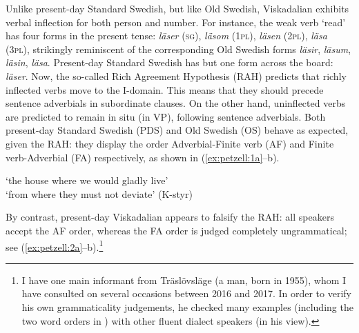 \documentclass[output=paper,colorlinks,citecolor=brown,draft,draftmode]{langscibook}
\begin{document}
Unlike present-day Standard Swedish, but like Old Swedish, Viskadalian exhibits verbal inflection for both person and number. For instance, the weak verb ‘read’ has four forms in the present tense: \textit{läser} (\textsc{sg}), \textit{läsom} (1\textsc{pl}), \textit{läsen} (2\textsc{pl}), \textit{läsa} (3\textsc{pl}), strikingly reminiscent of the corresponding Old Swedish forms \textit{läsir}, \textit{läsum}, \textit{läsin}, \textit{läsa}. Present-day Standard Swedish has but one form across the board: \textit{läser}. Now, the so-called Rich Agreement Hypothesis (RAH) predicts that richly inflected verbs move to the I-domain. This means that they should precede sentence adverbials in subordinate clauses. On the other hand, uninflected verbs are predicted to remain {in situ} (in VP), following sentence adverbials. Both present-day Standard Swedish (PDS) and Old Swedish (OS) behave as expected, given the RAH: they display the order Adverbial-Finite verb (AF) and Finite verb-Adverbial (FA) respectively, as shown in (\ref{ex:petzell:1a}–b).


\ea\label{ex:petzell:1}
\glt `the house where we would gladly live’  \\
\glt `from where they must not deviate’ (K-styr)
\z
\z


By contrast, present-day Viskadalian appears to falsify the RAH: all speakers accept the AF order, whereas the FA order is judged completely ungrammatical; see (\ref{ex:petzell:2a}–b).\footnote{I have one main informant from Träslövsläge (a man, born in 1955), whom I have consulted on several occasions between 2016 and 2017. In order to verify his own grammaticality judgements, he checked many examples (including the two word orders in ) with other fluent dialect speakers (in his view).}


\ea\label{ex:petzell:2}
\z
\z
\end{document}
